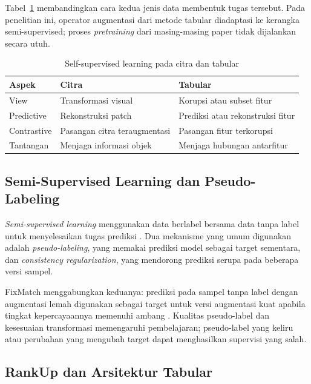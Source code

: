 Tabel~\ref{tab:ii} membandingkan cara kedua jenis data membentuk tugas tersebut. Pada penelitian ini, operator augmentasi dari metode tabular diadaptasi ke kerangka semi-supervised; proses \textit{pretraining} dari masing-masing paper tidak dijalankan secara utuh.

\begin{table}[!t]
\caption{Self-supervised learning pada citra dan tabular}
\label{tab:ii}
\centering
\footnotesize
\setlength{\tabcolsep}{3pt}
\renewcommand{\arraystretch}{1.1}
\begin{tabularx}{\columnwidth}{p{}XX}
\hline
\textbf{Aspek} & \textbf{Citra} & \textbf{Tabular} \\
\hline
View & Transformasi visual & Korupsi atau subset fitur \\
Predictive & Rekonstruksi patch & Prediksi atau rekonstruksi fitur \\
Contrastive & Pasangan citra teraugmentasi & Pasangan fitur terkorupsi \\
Tantangan & Menjaga informasi objek & Menjaga hubungan antarfitur \\
\hline
\end{tabularx}
\end{table}

\subsection{Semi-Supervised Learning dan Pseudo-Labeling}

\textit{Semi-supervised learning} menggunakan data berlabel bersama data tanpa label untuk menyelesaikan tugas prediksi \cite{ref8}. Dua mekanisme yang umum digunakan adalah \textit{pseudo-labeling}, yang memakai prediksi model sebagai target sementara, dan \textit{consistency regularization}, yang mendorong prediksi serupa pada beberapa versi sampel.

FixMatch menggabungkan keduanya: prediksi pada sampel tanpa label dengan augmentasi lemah digunakan sebagai target untuk versi augmentasi kuat apabila tingkat kepercayaannya memenuhi ambang \cite{ref9}. Kualitas pseudo-label dan kesesuaian transformasi memengaruhi pembelajaran; pseudo-label yang keliru atau perubahan yang mengubah target dapat menghasilkan supervisi yang salah.

\subsection{RankUp dan Arsitektur Tabular}

